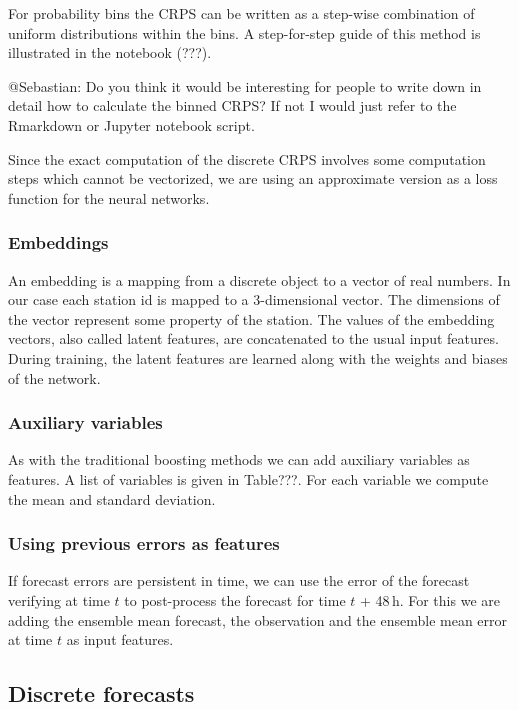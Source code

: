 \documentclass[a4paper,10pt]{scrartcl}
\begin{document}
For probability bins the CRPS can be written as a step-wise combination of uniform distributions within the bins. A step-for-step guide of this method is illustrated in the notebook (???).

@Sebastian: Do you think it would be interesting for people to write down in detail how to calculate the binned CRPS? If not I would just refer to the Rmarkdown or Jupyter notebook script.

Since the exact computation of the discrete CRPS involves some computation steps which cannot be vectorized, we are using an approximate version as a loss function for the neural networks. 


\subsubsection{Embeddings}

An embedding is a mapping from a discrete object to a vector of real numbers. In our case each station id is mapped to a 3-dimensional vector. The dimensions of the vector represent some property of the station. The values of the embedding vectors, also called latent features, are concatenated to the usual input features. During training, the latent features are learned along with the weights and biases of the network. 

\subsubsection{Auxiliary variables}

As with the traditional boosting methods we can add auxiliary variables as features. A list of variables is given in Table???. For each variable we compute the mean and standard deviation. 

\subsubsection{Using previous errors as features}

If forecast errors are persistent in time, we can use the error of the forecast verifying at time $t$ to post-process the forecast for time $t$ + 48\,h. For this we are adding the ensemble mean forecast, the observation and the ensemble mean error at time $t$ as input features.

\subsection{Discrete forecasts}
\end{document}
